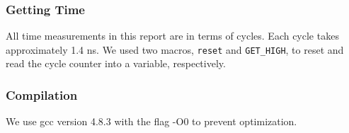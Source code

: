 \subsubsection{Getting Time}
All time measurements in this report are in terms of cycles. Each cycle takes approximately 1.4 ns. We used two macros, {\tt reset} and {\tt GET\_HIGH}, to reset and read the cycle counter into a variable, respectively.

\subsubsection{Compilation}
We use gcc version 4.8.3 with the flag -O0 to prevent optimization.